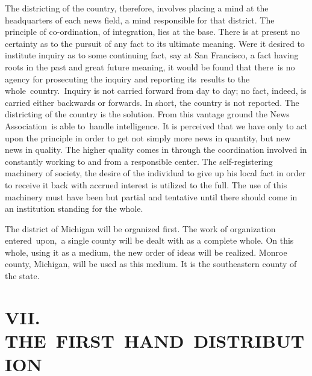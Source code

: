 \documentclass[twoside,symmetric,nobib,justified]{tufte-book}
\begin{document}
The districting of the country, therefore, involves placing a mind at
the headquarters of each news field, a mind responsible for that
district. The principle of co-ordination, of integration, lies at the
base. There is at present no certainty as to the pursuit of any fact to
its ultimate meaning. Were it desired to institute inquiry as to some
continuing fact, say at San Francisco, a fact having roots in the past
and great future meaning, it would be found that there~is no agency for
prosecuting the inquiry and reporting its~results to the
whole~country.~Inquiry is not carried forward from day to day; no fact,
indeed, is carried either backwards or forwards. In short, the country
is not reported. The districting of the country is the solution. From
this vantage ground the News Association~is able to~handle intelligence.
It is perceived that we have only to act upon the principle in order to
get not simply more news in quantity, but new news in quality. The
higher quality comes in through the coordination involved in constantly
working to and from a responsible center. The self-registering machinery
of society, the desire of the individual to give up his local fact in
order to receive it back with accrued interest is utilized to the full.
The use of this machinery must have been but partial and tentative until
there should come in an institution standing for the whole.~

The district of Michigan will be organized first. The work of
organization entered~upon,~a single county will be dealt with as a
complete whole. On this whole, using it as a medium, the new order of
ideas will be realized. Monroe county, Michigan, will be used as this
medium. It is the southeastern county of the state.~



\hypertarget{vii-the-first-hand-distribution}{%
\section{VII.
THE~FIRST~HAND~DISTRIBUTION}\label{vii-the-first-hand-distribution}}
\end{document}
